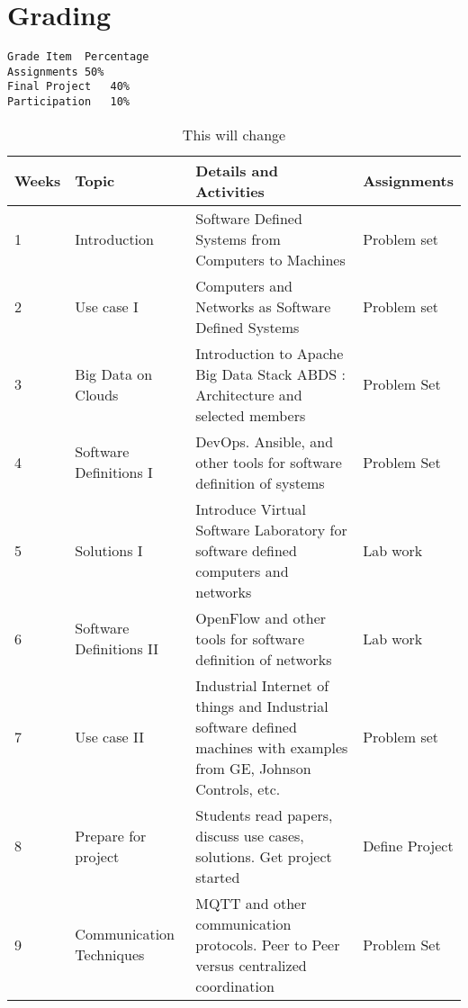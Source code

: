 \section{Grading}

\begin{verbatim}
Grade Item	Percentage
Assignments	50%
Final Project	40%
Participation	10%
\end{verbatim}

\begin{table}[h]
\centering
\caption{This will change}
\label{T:e621}
\begin{tabular}{p{1cm}p{4cm}p{6cm}p{2cm}}
Weeks & Topic                    & Details and Activities  & Assignments          \\
\hline
1     & Introduction             & Software Defined Systems from Computers to Machines                                                                  & Problem set          \\
2     & Use case I               & Computers and Networks as Software Defined Systems                                                                   & Problem set          \\
3     & Big Data on Clouds       & Introduction to Apache Big Data Stack ABDS : Architecture and selected members                                       & Problem Set          \\
4     & Software Definitions I   & DevOps. Ansible, and other tools for software definition of systems                                                  & Problem Set          \\
5     & Solutions I              & Introduce Virtual Software Laboratory for software defined computers and networks                                    & Lab work             \\
6     & Software Definitions II  & OpenFlow and other tools for software definition of networks                                                         & Lab work             \\
7     & Use case II              & Industrial Internet of things and Industrial software defined machines with examples from GE, Johnson Controls, etc. & Problem set          \\
8     & Prepare for project      & Students read papers, discuss use cases, solutions. Get project started                                              & Define Project       \\
9     & Communication Techniques & MQTT and other communication protocols. Peer to Peer versus centralized coordination                                 & Problem Set          \\

\end{tabular}
\end{table}
